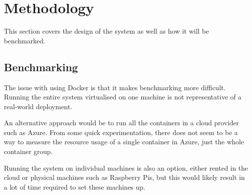 \section{Methodology}

This section covers the design of the system as well as how it will be benchmarked.



\subsection{Benchmarking}

The issue with using Docker is that it makes benchmarking more difficult.
Running the entire system virtualised on one machine is not representative of a real-world deployment.

An alternative approach would be to run all the containers in a cloud provider such as Azure.
From some quick experimentation, there does not seem to be a way to measure the resource usage of a single container in Azure, just the whole container group.

Running the system on individual machines is also an option, either rented in the cloud or physical machines such as Raspberry Pis, but this would likely result in a lot of time required to set these machines up.
